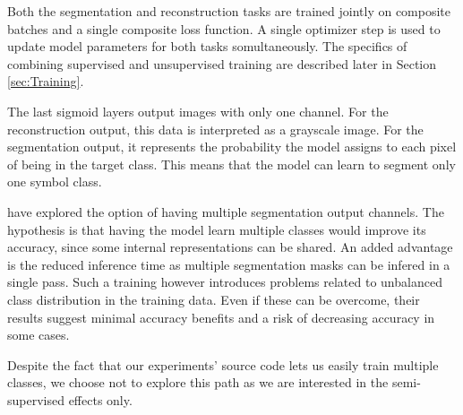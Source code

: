 Both the segmentation and reconstruction tasks are trained jointly on composite batches and a single composite loss function. A single optimizer step is used to update model parameters for both tasks somultaneously. The specifics of combining supervised and unsupervised training are described later in Section \ref{sec:Training}.

The last sigmoid layers output images with only one channel. For the reconstruction output, this data is interpreted as a grayscale image. For the segmentation output, it represents the probability the model assigns to each pixel of being in the target class. This means that the model can learn to segment only one symbol class.

\cite{HajicEtAl} have explored the option of having multiple segmentation output channels. The hypothesis is that having the model learn multiple classes would improve its accuracy, since some internal representations can be shared. An added advantage is the reduced inference time as multiple segmentation masks can be infered in a single pass. Such a training however introduces problems related to unbalanced class distribution in the training data. Even if these can be overcome, their results suggest minimal accuracy benefits and a risk of decreasing accuracy in some cases.

Despite the fact that our experiments' source code lets us easily train multiple classes, we choose not to explore this path as we are interested in the semi-supervised effects only.

